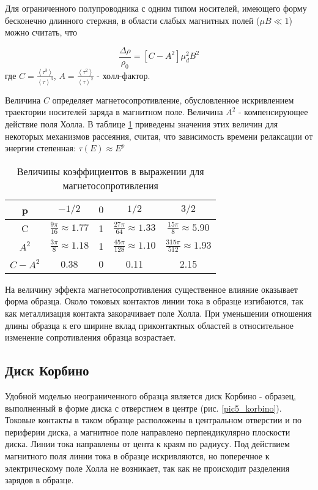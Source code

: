 Для ограниченного полупроводника с одним типом носителей, имеющего форму бесконечно длинного стержня, в области слабых магнитных полей ($\mu B \ll 1$) можно считать, что

\begin{equation}
\frac{\Delta \rho}{\rho_{0}} = [C - A^2] \mu^{2}_{d} B^2
\end{equation}
где $C = \frac{\left< \tau^3 \right>}{\left< \tau \right>^3}$, $A = \frac{\left< \tau^2 \right>}{\left< \tau \right>^2}$ - холл-фактор.

Величина $C$ определяет магнетосопротивление, обусловленное искривлением траектории носителей заряда в магнитном поле. Величина $A^2$ - компенсирующее действие поля Холла. В таблице \ref{table5_koef} приведены значения этих величин для некоторых механизмов рассеяния, считая, что зависимость времени релаксации от энергии степенная: $\tau(E) \approx E^p$

\begin{table}[h!]
\caption{Величины коэффициентов в выражении для магнетосопротивления}
\begin{center}
\begin{tabular}{c|c|c|c|c}
p & $-1/2$ & $0$ & $1/2$ & $3/2$ \\
\hline
C & $\frac{9 \pi}{16} \approx 1.77$ & 1 & $\frac{27 \pi}{64} \approx 1.33$ & $\frac{15 \pi}{8} \approx 5.90$ \\
$A^2$ & $\frac{3 \pi}{8} \approx 1.18$ & 1 & $\frac{45 \pi}{128} \approx 1.10$ & $\frac{315 \pi}{512} \approx 1.93$ \\
$C-A^2$ & 0.38 & 0 & 0.11 & 2.15 \\
\hline
\end{tabular}
\end{center}
\label{table5_koef}
\end{table}

На величину эффекта магнетосопротивления существенное влияние оказывает форма образца. Около токовых контактов линии тока в образце изгибаются, так как металлизация контакта закорачивает поле Холла. При уменьшении отношения длины образца к его ширине вклад приконтактных областей в относительное изменение сопротивления образца возрастает.

\subsection{Диск Корбино}
Удобной моделью неограниченного образца является диск Корбино - образец, выполненный в форме диска с отверстием в центре (рис. \ref{pic5_korbino}). Токовые контакты в таком образце расположены в центральном отверстии и по периферии диска, а магнитное поле направлено перпендикулярно плоскости диска. Линии тока направлены от цента к краям по радиусу. Под действием магнитного поля линии тока в образце искривляются, но поперечное к электрическому поле Холла не возникает, так как не происходит разделения зарядов в образце.

